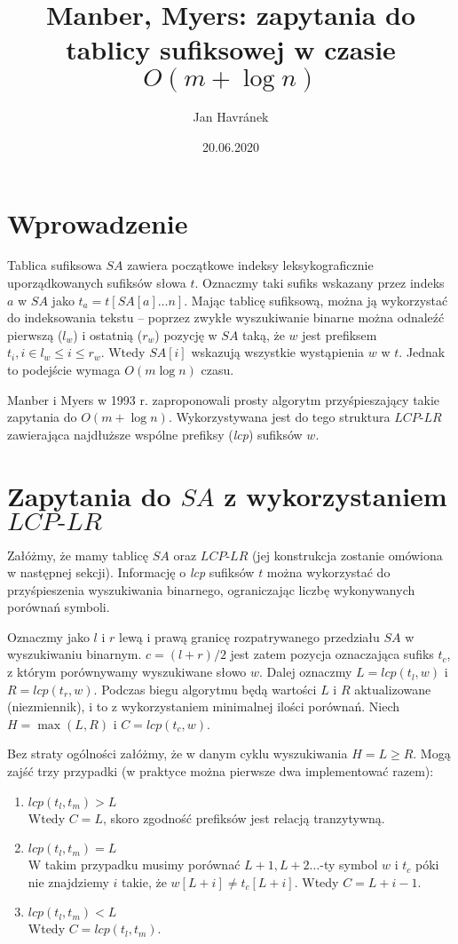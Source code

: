 \documentclass[12pt]{article}
\title{Manber, Myers: zapytania do tablicy sufiksowej w czasie $O(m + \log{} n)$}
\author{Jan Havránek}
\date{20.06.2020}
\begin{document}
\maketitle

\section*{Wprowadzenie}
Tablica sufiksowa $SA$ zawiera początkowe indeksy leksykograficznie uporządkowanych sufiksów słowa $t$. Oznaczmy taki sufiks wskazany przez indeks $a$ w $SA$ jako $t_a = t[SA[a]\ldots n]$. Mając tablicę sufiksową, można ją wykorzystać do indeksowania tekstu -- poprzez zwykłe wyszukiwanie binarne można odnaleźć pierwszą ($l_w$) i ostatnią ($r_w$) pozycję w $SA$ taką, że $w$ jest prefiksem $t_i, i \in l_w \leq i \leq r_w$. Wtedy $SA[i]$ wskazują wszystkie wystąpienia $w$ w $t$. Jednak to podejście wymaga $O(m \log{} n)$ czasu.

Manber i Myers w 1993 r. zaproponowali prosty algorytm przyśpieszający takie zapytania do $O(m + \log{} n)$. Wykorzystywana jest do tego struktura $LCP\textrm{-}LR$ zawierająca najdłuższe wspólne prefiksy (\textit{lcp}) sufiksów $w$. 

\section*{Zapytania do $SA$ z wykorzystaniem $LCP\textrm{-}LR$}

Załóżmy, że mamy tablicę $SA$ oraz $LCP\textrm{-}LR$ (jej konstrukcja zostanie omówiona w następnej sekcji). Informację o \textit{lcp} sufiksów $t$ można wykorzystać do przyśpieszenia wyszukiwania binarnego, ograniczając liczbę wykonywanych porównań symboli. 

Oznaczmy jako $l$ i $r$ lewą i prawą granicę rozpatrywanego przedziału $SA$ w wyszukiwaniu binarnym. $c = (l + r) / 2 $ jest zatem pozycja oznaczająca sufiks $t_c$, z którym porównywamy wyszukiwane słowo $w$. Dalej oznaczmy $L = lcp(t_l, w)$ i $R = lcp(t_r, w)$. Podczas biegu algorytmu będą wartości $L$ i $R$ aktualizowane (niezmiennik), i to z wykorzystaniem minimalnej ilości porównań. Niech $H = \max (L, R)$ i $C = lcp(t_c, w)$. 

Bez straty ogólności załóżmy, że w danym cyklu wyszukiwania $H = L \geq R$. Mogą zajść trzy przypadki (w praktyce można pierwsze dwa implementować razem):

\begin{enumerate}
    \item $lcp(t_l, t_m) > L$ \\
          Wtedy $C = L$, skoro zgodność prefiksów jest relacją tranzytywną.
    \item $lcp(t_l, t_m) = L$ \\
          W takim przypadku musimy porównać $L+1, L+2\ldots$-ty symbol $w$ i $t_c$ póki nie znajdziemy $i$ takie, że $w[L+i] \neq t_c[L+i]$. Wtedy $C = L + i - 1$. 
    \item $lcp(t_l, t_m) < L$ \\
          Wtedy $C = lcp(t_l, t_m)$.
\end{enumerate}
\end{document}
